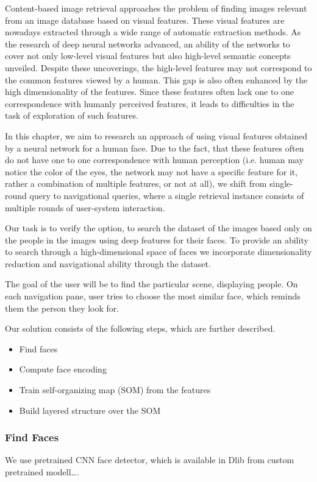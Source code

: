 Content-based image retrieval approaches the problem of finding images relevant from an image database based on visual features. These visual features are nowadays extracted through a wide range of automatic extraction methods. As the research of deep neural networks advanced, an ability of the networks to cover not only low-level visual features but also high-level semantic concepts unveiled. Despite these uncoverings, the high-level features may not correspond to the common features viewed by a human. This gap is also often enhanced by the high dimensionality of the features. Since these features often lack one to one correspondence with humanly perceived features, it leads to difficulties in the task of exploration of such features.

In this chapter, we aim to research an approach of using visual features obtained by a neural network for a human face. Due to the fact, that these features often do not have one to one correspondence with human perception (i.e. human may notice the color of the eyes, the network may not have a specific feature for it, rather a combination of multiple features, or not at all), we shift from single-round query to navigational queries, where a single retrieval instance consists of multiple rounds of user-system interaction.

Our task is to verify the option, to search the dataset of the images based only on the people in the images using deep features for their faces. To provide an ability to search through a high-dimensional space of faces we incorporate dimensionality reduction and navigational ability through the dataset.

The goal of the user will be to find the particular scene, displaying people. On each navigation pane, user tries to choose the most similar face, which reminds them the person they look for. 

Our solution consists of the following steps, which are further described.
\begin{itemize}
    \item Find faces
    \item Compute face encoding
    \item Train self-organizing map (SOM) from the features
    \item Build layered structure over the SOM
\end{itemize}

\subsubsection*{Find Faces}
We use pretrained CNN face detector, which is available in Dlib from custom pretrained modell….


